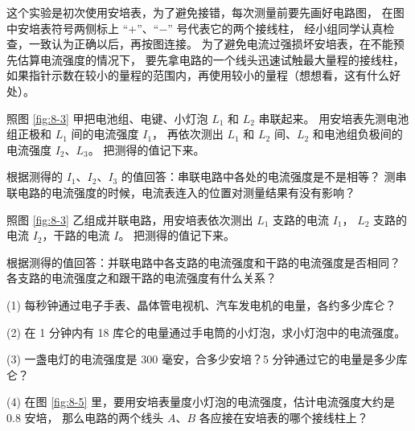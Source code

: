 这个实验是初次使用安培表，为了避免接错，每次测量前要先画好电路图，
在图中安培表符号两侧标上 “$+$”、“$-$” 号代表它的两个接线柱，
经小组同学认真检查，一致认为正确以后，再按图连接。
为了避免电流过强损坏安培表，在不能预先估算电流强度的情况下，
要先拿电路的一个线头迅速试触最大量程的接线柱，
如果指针示数在较小的量程的范围内，再使用较小的量程（想想看，这有什么好处）。

照图 \ref{fig:8-3} 甲把电池组、电键、小灯泡 $L_1$ 和 $L_2$ 串联起来。
用安培表先测电池组正极和 $L_1$ 间的电流强度 $I_1$，
再依次测出 $L_1$ 和 $L_2$ 间、$L_2$ 和电池组负极间的电流强度 $I_2$、$L_3$。
把测得的值记下来。

根据测得的 $I_1$、$I_2$、$I_3$ 的值回答：串联电路中各处的电流强度是不是相等？
测串联电路的电流强度的时候，电流表连入的位置对测量结果有没有影响？

照图 \ref{fig:8-3} 乙组成并联电路，用安培表依次测出
$L_1$ 支路的电流 $I_1$， $L_2$ 支路的电流 $I_2$，干路的电流 $I$。
把测得的值记下来。

根据测得的值回答：并联电路中各支路的电流强度和干路的电流强度是否相同？
各支路的电流强度之和跟干路的电流强度有什么关系？


\lianxi

(1) 每秒钟通过电子手表、晶体管电视机、汽车发电机的电量，各约多少库仑？

(2) 在 1 分钟内有 18 库仑的电量通过手电筒的小灯泡，求小灯泡中的电流强度。

(3) 一盏电灯的电流强度是 300 毫安，合多少安培？5 分钟通过它的电量是多少库仑？

(4) 在图 \ref{fig:8-5} 里，要用安培表量度小灯泡的电流强度，估计电流强度大约是 0.8 安培，
那么电路的两个线头 $A$、$B$ 各应接在安培表的哪个接线柱上？

